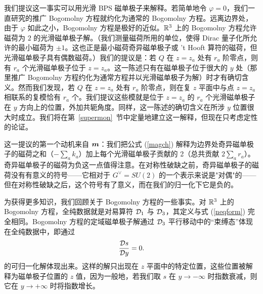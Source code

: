 我们提议这一事实可以用光滑 BPS 磁单极子来解释。若简单地令 $\varphi=0$，我们一直研究的推广 Bogomolny 方程就约化为通常的 Bogomolny 方程。远离边界处，由于 $\varphi$ 如此之小，Bogomolny 方程是极好的近似。${\mathbb R}^3$ 上的 Bogomolny 方程允许磁荷为 $2$ 的光滑磁单极子解。（我们测量磁荷所用的单位，使得 Dirac 量子化所允许的最小磁荷为 $\pm 1$。这也正是最小磁荷奇异磁单极子或 't Hooft 算符的磁荷，但光滑磁单极子具有偶数磁荷。）我们的提议是：若 $Q$ 在 $z=z_a$ 处有 $r_a$ 阶零点，则有 $r_a$ 个光滑磁单极子位于 $z=z_a$。这一陈述只有在磁单极子位于很大的 $y$ 处（那里推广 Bogomolny 方程约化为通常方程并以光滑磁单极子为解）时才有确切含义。然而我们发现，若 $Q$ 在 $z=z_a$ 处有 $r_a$ 阶零点，则在复 $z$ 平面中与点 $z=z_a$ 相联系的复模恰有 $r_a$ 个。我们提议这些模就是位于 $z=z_a$ 的 $r_a$ 个光滑磁单极子在 $y$ 方向上的位置，外加共轭角度。同样，这一陈述的确切含义在所涉 $y$ 位置很大时成立。我们将在第~\ref{supermon}~节中定量地建立这一解释，但现在只考虑定性的论证。

这一提议的第一个动机来自 $\boldsymbol{m}$：我们把公式 (\ref{magch}) 解释为边界处奇异磁单极子的磁荷之和（$-\sum_ak_a$）加上每个光滑磁单极子贡献的 2（总共贡献 $2\sum_ar_a$）。奇异磁单极子的磁荷为负这一点值得注意。在对称性破缺之前，奇异磁单极子的磁荷没有有意义的符号——它相对于 $G^\vee=SU(2)$ 的一个表示来说是"对偶"的——但在对称性破缺之后，这个符号有了意义，而在我们的归一化下它是负的。


为获得更多知识，我们回顾关于 Bogomolny 方程的一些事实。对 ${\mathbb R}^3$ 上的 Bogomolny 方程，全纯数据就是对易算符 ${\mathcal D}_1$ 与 ${\mathcal D}_3$，其定义与式 (\ref{neqform}) 完全相同。Bogomolny 方程的定域磁单极子解通过 ${\mathcal D}_3$ 平行移动中的“束缚态”体现在全纯数据中，即通过
\begin{equation}\label{zonurf}\frac{{\mathcal D} s}{{\mathcal D} y}=0.\end{equation}
的可归一化解体现出来。这样的解只出现在 $z$ 平面中的特定位置，这些位置被解释为磁单极子位置的 $z$ 值，因为一般地，若我们取 $s$ 在 $y\to -\infty$ 时指数衰减，则它在 $y\to +\infty$ 时将指数增长。

